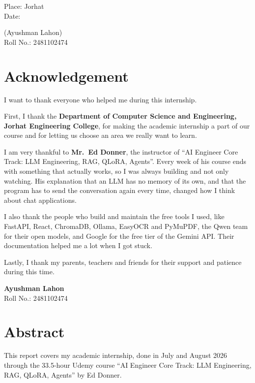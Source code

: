 \documentclass[12pt,a4paper]{report}
\begin{document}
\vspace{2.2cm}
\noindent
\begin{minipage}[t]{0.45\textwidth}
Place: Jorhat\\[6pt]
Date:
\end{minipage}\hfill
\begin{minipage}[t]{0.45\textwidth}\raggedleft
(Ayushman Lahon)\\
Roll No.: 2481102474
\end{minipage}

\chapter*{Acknowledgement}
I want to thank everyone who helped me during this internship.

First, I thank the \textbf{Department of Computer Science and Engineering, Jorhat
Engineering College}, for making the academic internship a part of our course and for
letting us choose an area we really want to learn.

I am very thankful to \textbf{Mr.\ Ed Donner}, the instructor of ``AI Engineer Core Track:
LLM Engineering, RAG, QLoRA, Agents''. Every week of his course ends with something that
actually works, so I was always building and not only watching. His explanation that an
LLM has no memory of its own, and that the program has to send the conversation again
every time, changed how I think about chat applications.

I also thank the people who build and maintain the free tools I used, like FastAPI, React,
ChromaDB, Ollama, EasyOCR and PyMuPDF, the Qwen team for their open models, and Google for
the free tier of the Gemini API. Their documentation helped me a lot when I got stuck.

Lastly, I thank my parents, teachers and friends for their support and patience during
this time.

\vspace{1.6cm}
\begin{flushright}
\textbf{Ayushman Lahon}\\
Roll No.: 2481102474
\end{flushright}

\chapter*{Abstract}
This report covers my academic internship, done in July and August 2026 through the
33.5-hour Udemy course ``AI Engineer Core Track: LLM Engineering, RAG, QLoRA, Agents'' by
Ed Donner.
\end{document}
